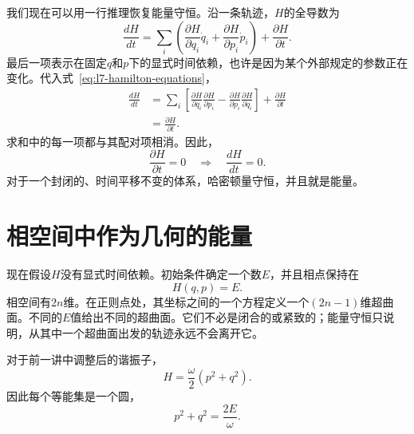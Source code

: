 我们现在可以用一行推理恢复能量守恒。沿一条轨迹，\(H\)的全导数为
\begin{equation}
  \frac{dH}{dt}
  =
  \sum_i\left(
    \frac{\partial H}{\partial q_i}\dot q_i
    +\frac{\partial H}{\partial p_i}\dot p_i
  \right)
  +\frac{\partial H}{\partial t}.
  \label{eq:l7-total-h-derivative}
\end{equation}
最后一项表示在固定\(q\)和\(p\)下的显式时间依赖，也许是因为某个外部规定的参数正在变化。代入式~\eqref{eq:l7-hamilton-equations}，
\begin{align}
  \frac{dH}{dt}
  &=
  \sum_i\left[
    \frac{\partial H}{\partial q_i}
    \frac{\partial H}{\partial p_i}
    -\frac{\partial H}{\partial p_i}
    \frac{\partial H}{\partial q_i}
  \right]
  +\frac{\partial H}{\partial t}\\
  &=\frac{\partial H}{\partial t}.
  \label{eq:l7-h-energy-rate}
\end{align}
求和中的每一项都与其配对项相消。因此，
\begin{equation}
  \frac{\partial H}{\partial t}=0
  \quad\Longrightarrow\quad
  \frac{dH}{dt}=0.
  \label{eq:l7-energy-conservation}
\end{equation}
对于一个封闭的、时间平移不变的体系，哈密顿量守恒，并且就是能量。

\begin{classroomqa}
\end{classroomqa}

\section{相空间中作为几何的能量}

现在假设\(H\)没有显式时间依赖。初始条件确定一个数\(E\)，并且相点保持在
\begin{equation}
  H(q,p)=E.
  \label{eq:l7-energy-surface}
\end{equation}
相空间有\(2n\)维。在正则点处，其坐标之间的一个方程定义一个\((2n-1)\)维超曲面。不同的\(E\)值给出不同的超曲面。它们不必是闭合的或紧致的；能量守恒只说明，从其中一个超曲面出发的轨迹永远不会离开它。

对于前一讲中调整后的谐振子，
\begin{equation}
  H=\frac{\omega}{2}(p^2+q^2).
  \label{eq:l7-oscillator-hamiltonian}
\end{equation}
因此每个等能集是一个圆，
\begin{equation}
  p^2+q^2=\frac{2E}{\omega}.
  \label{eq:l7-oscillator-circle}
\end{equation}

